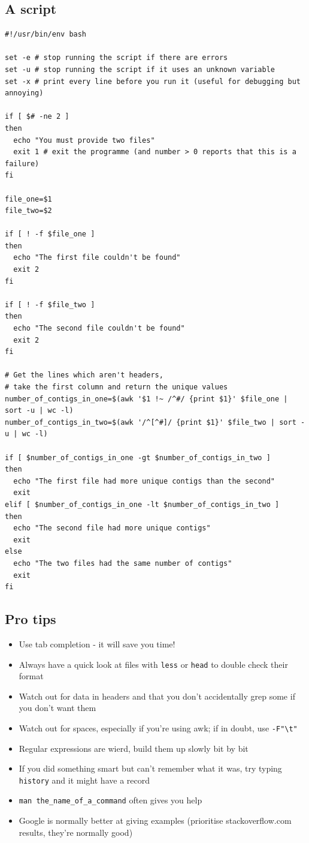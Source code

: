 \documentclass[11pt]{article}
\providecommand{\tightlist}{%
      \setlength{\itemsep}{0pt}\setlength{\parskip}{0pt}}
\begin{document}
\hypertarget{a-script}{%
\subsection{A script}\label{a-script}}

\begin{verbatim}
#!/usr/bin/env bash

set -e # stop running the script if there are errors
set -u # stop running the script if it uses an unknown variable
set -x # print every line before you run it (useful for debugging but annoying)

if [ $# -ne 2 ]
then
  echo "You must provide two files"
  exit 1 # exit the programme (and number > 0 reports that this is a failure)
fi

file_one=$1
file_two=$2

if [ ! -f $file_one ]
then
  echo "The first file couldn't be found"
  exit 2
fi

if [ ! -f $file_two ]
then
  echo "The second file couldn't be found"
  exit 2
fi

# Get the lines which aren't headers,
# take the first column and return the unique values
number_of_contigs_in_one=$(awk '$1 !~ /^#/ {print $1}' $file_one | sort -u | wc -l)
number_of_contigs_in_two=$(awk '/^[^#]/ {print $1}' $file_two | sort -u | wc -l)

if [ $number_of_contigs_in_one -gt $number_of_contigs_in_two ]
then
  echo "The first file had more unique contigs than the second"
  exit
elif [ $number_of_contigs_in_one -lt $number_of_contigs_in_two ]
then
  echo "The second file had more unique contigs"
  exit
else
  echo "The two files had the same number of contigs"
  exit
fi
\end{verbatim}

\hypertarget{pro-tips}{%
\subsection{Pro tips}\label{pro-tips}}

\begin{itemize}
\tightlist
\item
  Use tab completion - it will save you time!
\item
  Always have a quick look at files with \texttt{less} or \texttt{head}
  to double check their format
\item
  Watch out for data in headers and that you don't accidentally grep
  some if you don't want them
\item
  Watch out for spaces, especially if you're using awk; if in doubt, use
  \texttt{-F"\textbackslash{}t"}
\item
  Regular expressions are wierd, build them up slowly bit by bit
\item
  If you did something smart but can't remember what it was, try typing
  \texttt{history} and it might have a record
\item
  \texttt{man\ the\_name\_of\_a\_command} often gives you help
\item
  Google is normally better at giving examples (prioritise
  stackoverflow.com results, they're normally good)
\end{itemize}
\end{document}
